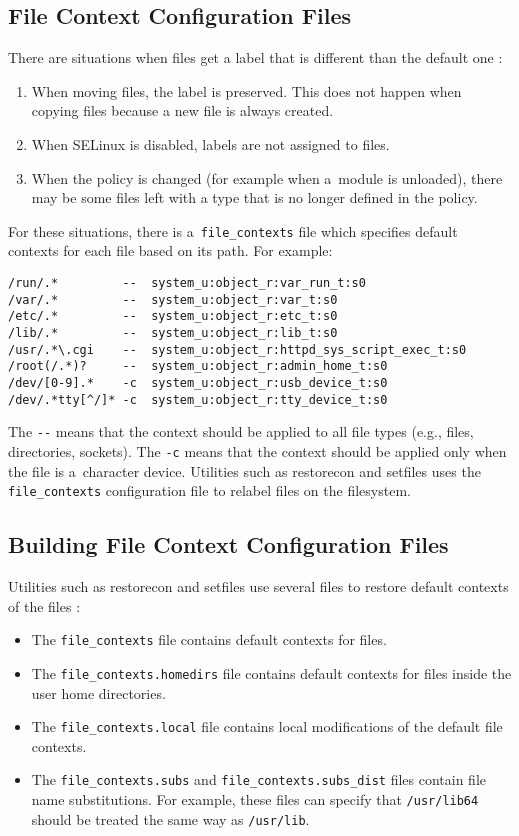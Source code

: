 \subsection{File Context Configuration Files}
There are situations when files get a label that is different than the default
one \cite{selinuxguide}:
\begin{enumerate}
    \item When moving files, the label is preserved. This does not happen when
        copying files because a new file is always created.
    \item When SELinux is disabled, labels are not assigned to files.
    \item When the policy is changed (for example when a~module is unloaded),
        there may be some files left with a type that is no longer defined in
        the policy.
\end{enumerate}
For these situations, there is a~\texttt{file\_contexts} file which specifies
default contexts for each file based on its path. For example:
\begin{lstlisting}
/run/.*         --  system_u:object_r:var_run_t:s0
/var/.*	        --  system_u:object_r:var_t:s0
/etc/.*	        --  system_u:object_r:etc_t:s0
/lib/.*	        --  system_u:object_r:lib_t:s0
/usr/.*\.cgi    --  system_u:object_r:httpd_sys_script_exec_t:s0
/root(/.*)?     --  system_u:object_r:admin_home_t:s0
/dev/[0-9].*    -c  system_u:object_r:usb_device_t:s0
/dev/.*tty[^/]* -c  system_u:object_r:tty_device_t:s0
\end{lstlisting}
The \texttt{-{}-} means that the context should be applied to all file types
(e.g., files, directories, sockets). The \texttt{-c} means that the context
should be applied only when the file is a~character device. Utilities such as
restorecon and setfiles uses the \texttt{file\_contexts} configuration file to
relabel files on the filesystem.

\subsection{Building File Context Configuration Files}
Utilities such as restorecon and setfiles use several files to restore default
contexts of the files \cite[pp.~165--167]{tsn}:
\begin{itemize}
    \item The \texttt{file\_contexts} file contains default contexts for files.
    \item The \texttt{file\_contexts.homedirs} file contains default contexts
        for files inside the user home directories.
    \item The \texttt{file\_contexts.local} file contains local modifications of
        the default file contexts.
    \item The \texttt{file\_contexts.subs} and
        \texttt{file\_contexts.subs\_dist} files contain file name
        substitutions. For example, these files can specify that
        \texttt{/usr/lib64} should be treated the same way as \texttt{/usr/lib}.
\end{itemize}

